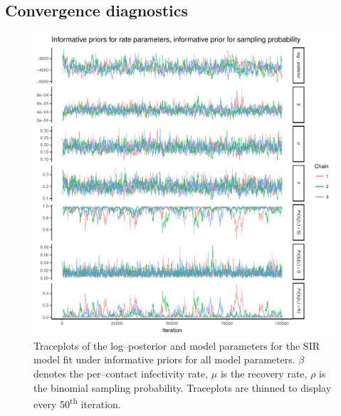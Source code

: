 \subsection{Convergence diagnostics}
\begin{figure}[htbp]
	\centering
	\includegraphics[width=0.9\linewidth]{figures/informative_informative_traceplots.pdf}
	\caption[Simuation 4 MCMC traceplots for SIR model parameters fit under informative priors for all parameters.]{Traceplots of the log--posterior and model parameters for the SIR model fit under informative priors for all model parameters. $ \beta $ denotes the per--contact infectivity rate, $ \mu $ is the recovery rate, $ \rho $ is the binomial sampling probability. Traceplots are thinned to display every 50\textsuperscript{th} iteration.}
	\label{fig:inform_inform_traces}
\end{figure}

